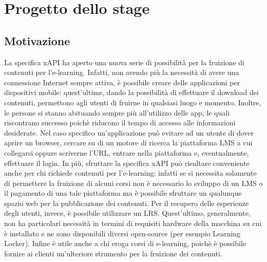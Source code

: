 \documentclass[../Tesi.tex]{subfiles}
\begin{document}
\section{Progetto dello stage}\label{sec:progettoStage}
	\subsection{Motivazione}
	La specifica xAPI ha aperto una nuova serie di possibilità per la fruizione di contenuti per l'e-learning. Infatti, non avendo più la necessità di avere una connessione Internet sempre attiva, è possibile creare delle applicazioni per dispositivi mobile: quest'ultime, dando la possibilità di effettuare il download dei contenuti, permettono agli utenti di fruirne in qualsiasi luogo e momento. Inoltre, le persone si stanno abituando sempre più all'utilizzo delle app, le quali riscontrano successo poichè riducono il tempo di accesso alle informazioni desiderate. Nel caso specifico un'applicazione può evitare ad un utente di dover aprire un browser, cercare su di un motore di ricerca la piattaforma LMS a cui collegarsi oppure scriverne l'URL, entrare nella piattaforma e, eventualmente, effettuare il login. In più, sfruttare la specifica xAPI può risultare conveniente anche per chi richiede contenuti per l’e-learning: infatti se si necessita solamente di permettere la fruizione di alcuni corsi non è necessario lo sviluppo di un LMS o il pagamento di una tale piattaforma ma è possibile sfruttare un qualunque spazio web per la pubblicazione dei contenuti. Per il recupero delle esperienze degli utenti, invece, è possibile utilizzare un LRS. Quest'ultimo, generalmente, non ha particolari necessità in termini di requisiti hardware della macchina su cui è installato e ne sono disponibili diversi open-source (per esempio Learning Locker). Infine è utile anche a chi eroga corsi di e-learning, poichè è possibile fornire ai clienti un’ulteriore strumento per la fruizione dei contenuti.
\end{document}
